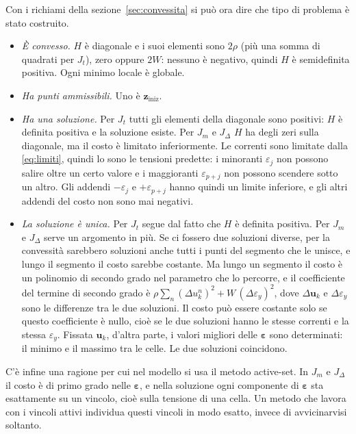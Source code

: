 \documentclass[11pt,a4paper]{article}
\newcommand{\vett}[1]{\boldsymbol{#1}}      %
\begin{document}
Con i richiami della sezione~\ref{sec:convessita} si può ora dire che tipo di
problema è stato costruito.
\begin{itemize}
  \item \emph{È convesso.} $H$ è diagonale e i suoi elementi sono
        $2\rho$ (più una somma di quadrati per $J_t$), zero oppure $2W$:
        nessuno è negativo, quindi $H$ è semidefinita positiva. Ogni minimo
        locale è globale.
  \item \emph{Ha punti ammissibili.} Uno è $\vett{z}_{\mathrm{iniz}}$.
  \item \emph{Ha una soluzione.} Per $J_t$ tutti gli elementi della diagonale
        sono positivi: $H$ è definita positiva e la soluzione esiste. Per
        $J_m$ e $J_\Delta$ $H$ ha degli zeri sulla diagonale, ma il costo è
        limitato inferiormente. Le correnti sono limitate dalla
        \eqref{eq:limiti}, quindi lo sono le tensioni predette: i minoranti
        $\varepsilon_j$ non possono salire oltre un certo valore e i
        maggioranti $\varepsilon_{p+j}$ non possono scendere sotto un altro.
        Gli addendi $-\varepsilon_j$ e $+\varepsilon_{p+j}$ hanno quindi un
        limite inferiore, e gli altri addendi del costo non sono mai negativi.
  \item \emph{La soluzione è unica.} Per $J_t$ segue dal fatto che $H$ è
        definita positiva. Per $J_m$ e $J_\Delta$ serve un argomento in più.
        Se ci fossero due soluzioni diverse, per la convessità sarebbero
        soluzioni anche tutti i punti del segmento che le unisce, e lungo il
        segmento il costo sarebbe costante. Ma lungo un segmento il costo è un
        polinomio di secondo grado nel parametro che lo percorre, e il
        coefficiente del termine di secondo grado è
        $\rho \sum_n (\Delta u^n_k)^2 + W\,(\Delta \varepsilon_y)^2$, dove $\Delta \vett{u}_k$ e
        $\Delta \varepsilon_y$ sono le differenze tra le due soluzioni. Il costo può essere
        costante solo se questo coefficiente è nullo, cioè se le due soluzioni
        hanno le stesse correnti e la stessa $\varepsilon_y$. Fissata $\vett{u}_k$, d'altra parte, i
        valori migliori delle $\vett{\varepsilon}$ sono determinati: il minimo e il
        massimo tra le celle. Le due soluzioni coincidono.
\end{itemize}
C'è infine una ragione per cui nel modello si usa il metodo active-set. In
$J_m$ e $J_\Delta$ il costo è di primo grado nelle $\vett{\varepsilon}$, e nella
soluzione ogni componente di $\vett{\varepsilon}$ sta esattamente su un vincolo, cioè sulla tensione
di una cella. Un metodo che lavora con i vincoli attivi individua questi
vincoli in modo esatto, invece di avvicinarvisi soltanto.
\end{document}

